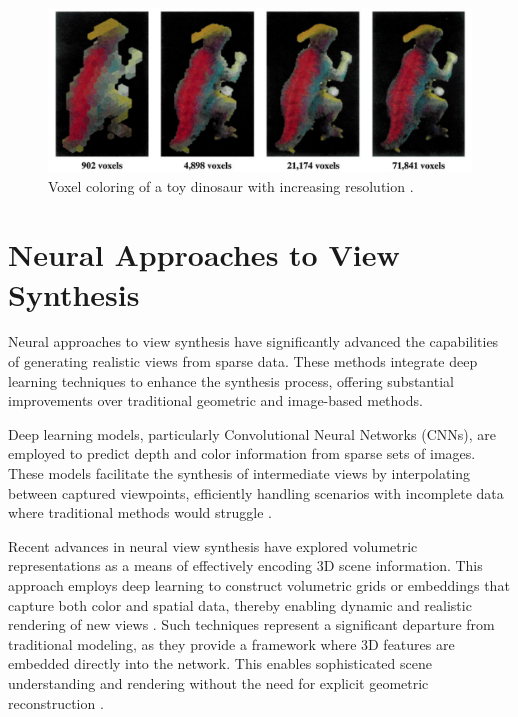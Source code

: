 \begin{figure}[h!]
  \centering
	\includegraphics[width=\textwidth]{figures/background-volumetric.png}
	\caption{Voxel coloring of a toy dinosaur with increasing resolution \cite{seitz_photorealistic_1999}.}
  \label{fig:background-volumetric}
\end{figure}


\section{Neural Approaches to View Synthesis}
Neural approaches to view synthesis have significantly advanced the capabilities of generating realistic views from sparse data.
These methods integrate deep learning techniques to enhance the synthesis process, offering substantial improvements over traditional geometric and image-based methods.

Deep learning models, particularly Convolutional Neural Networks (CNNs), are employed to predict depth and color information from sparse sets of images.
These models facilitate the synthesis of intermediate views by interpolating between captured viewpoints, efficiently handling scenarios with incomplete data where traditional methods would struggle \cite{kalantari_learning-based_2016,peter_hedman_deep_2019}.

Recent advances in neural view synthesis have explored volumetric representations as a means of effectively encoding 3D scene information.
This approach employs deep learning to construct volumetric grids or embeddings that capture both color and spatial data, thereby enabling dynamic and realistic rendering of new views .
Such techniques represent a significant departure from traditional modeling, as they provide a framework where 3D features are embedded directly into the network. This enables sophisticated scene understanding and rendering without the need for explicit geometric reconstruction \cite{lombardi_neural_2019,sitzmann_deepvoxels_2019}.

